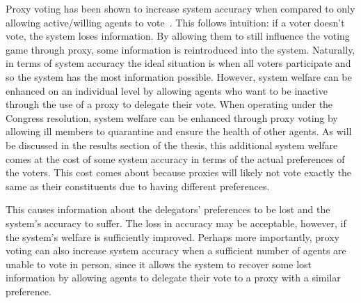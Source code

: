 Proxy voting has been shown to increase system accuracy when compared to only
allowing active/willing agents to vote~\cite{Cohensius2017}.
This follows intuition: if a voter doesn't vote, the system loses information.
By allowing them to still influence the voting game through proxy, some information
is reintroduced into the system.
Naturally, in terms of system accuracy the ideal situation is when all voters
participate and so the system has the most information possible.
However, system welfare can be enhanced on an individual level by allowing agents
who want to be inactive through the use of a proxy to delegate their vote.
When operating under the Congress resolution, system welfare can be enhanced through
proxy voting by allowing ill members to quarantine and ensure the health of other
agents.
As will be discussed in the results section of the thesis,
this additional system welfare comes at the cost of some system accuracy in terms of
the actual preferences of the voters.
This cost comes about because proxies will likely not vote exactly the same as their
constituents due to having different preferences.

This causes information about the delegators' preferences to be lost and the system's
accuracy to suffer.
The loss in accuracy may be acceptable, however, if the system's welfare is sufficiently
improved.
Perhaps more importantly, proxy voting can also increase system accuracy when a
sufficient number of agents are unable to vote in person, since it allows the system
to recover some lost information by allowing agents to delegate their vote to a proxy
with a similar preference.


